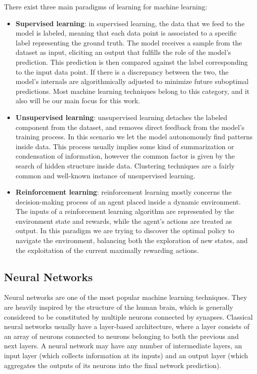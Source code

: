 There exist three main paradigms of learning for machine learning:
\begin{itemize}
    \item \textbf{Supervised learning}: in supervised learning, the data that we feed to the model is labeled, meaning that each data point is associated to a specific label representing the ground truth.
The model receives a sample from the dataset as input, eliciting an output that fulfills the role of the model's prediction.
This prediction is then compared against the label corresponding to the input data point.
If there is a discrepancy between the two, the model's internals are algorithmically adjusted to minimize future suboptimal predictions.
Most machine learning techniques belong to this category, and it also will be our main focus for this work.
    \item \textbf{Unsupervised learning}: unsupervised learning detaches the labeled component from the dataset, and removes direct feedback from the model's training process.
In this scenario we let the model autonomously find patterns inside data.
This process usually implies some kind of summarization or condensation of information, however the common factor is given by the search of hidden structure inside data.
Clustering techniques are a fairly common and well-known instance of unsupervised learning. 
    \item \textbf{Reinforcement learning}: reinforcement learning mostly concerns the decision-making process of an agent placed inside a dynamic environment.
The inputs of a reinforcement learning algorithm are represented by the environment state and rewards, while the agent's actions are treated as output.
In this paradigm we are trying to discover the optimal policy to navigate the environment, balancing both the exploration of new states, and the exploitation of the current maximally rewarding actions.
\end{itemize}

\subsection{Neural Networks}

Neural networks are one of the most popular machine learning techniques.
They are heavily inspired by the structure of the human brain, which is generally considered to be constituted by multiple neurons connected by synapses.
Classical neural networks usually have a layer-based architecture, where a layer consists of an array of neurons connected to neurons belonging to both the previous and next layers.
A neural network may have any number of intermediate layers, an input layer (which collects information at its inputs) and an output layer (which aggregates the outputs of its neurons into the final network prediction). 

